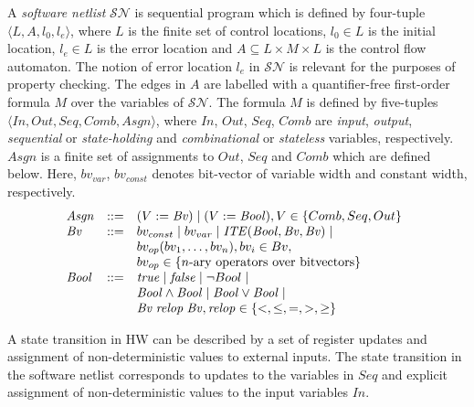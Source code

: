 %
\begin{definition} 
%
A \emph{software netlist} $\mathcal{SN}$ is sequential program 
which is defined by four-tuple $\langle L, A, l_0, l_e \rangle$, 
where $L$ is the finite set of control locations, $l_0 \in L$ 
is the initial location, $l_e \in L$ is the error location and 
$A \subseteq L \times M \times L$ is the control flow automaton.  
The notion of error location $l_e$ in $\mathcal{SN}$ is relevant 
for the purposes of property checking.  The edges in $A$ are 
labelled with a quantifier-free first-order formula $M$ over 
the variables of $\mathcal{SN}$. 
%  
The formula $M$ is defined by five-tuples 
$\langle In, Out,Seq, Comb, Asgn \rangle$, where $In$, $Out$, 
$Seq$, $Comb$ are \emph{input}, \emph{output}, \emph{sequential} 
or \emph{state-holding} and \emph{combinational} or 
\emph{stateless} variables, respectively.  $Asgn$ is a 
finite set of assignments to $Out$, $Seq$ and $Comb$ which 
are defined below.  Here, $bv_{var}$, $bv_{const}$ denotes 
bit-vector of variable width and constant width, respectively.  
%
\[ 
\begin{array}[t]{@{}lll}
\mathit{Asgn} & {:}{:}{=} & (V := \mathit{Bv}) \mid (V := \mathit{Bool}), V \in \{Comb, Seq, Out\} \\
\mathit{Bv} &  {:}{:}{=} & bv_{const} \mid bv_{var} \mid
	\mathit{ITE}(\mathit{Bool}, \mathit{Bv}, \mathit{Bv}) \mid \\
	& & bv_{op}(bv_1, \ldots, bv_n), bv_i \in Bv, \\ 
& & bv_{op} \in \{n\text{-ary operators over bitvectors} \} \\
  \mathit{Bool} & {:}{:}{=} & \mathit{true} \mid \mathit{false} \mid \neg{Bool} \mid \\
  && \mathit{Bool} \land \mathit{Bool} \mid \mathit{Bool} \lor \mathit{Bool} \mid \\
& & \mathit{Bv}\; \mathit{relop}\; \mathit{Bv}, \mathit{relop} \in \{<,\leq,=,>,\geq\} \\
\end{array}
\]
%
\end{definition} 
%
%
A state transition in HW can be described by a set of register
updates and assignment of non-deterministic values to external 
inputs. The state transition in the software netlist corresponds 
to updates to the variables in $\mathit{Seq}$ and explicit 
assignment of non-deterministic values to the input variables $\mathit{In}$.
%
